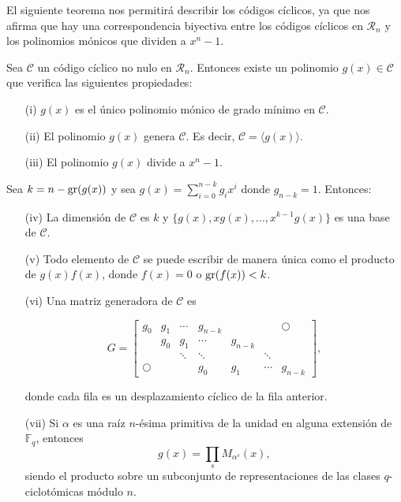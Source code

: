 El siguiente teorema nos permitirá describir los códigos cíclicos, ya que nos afirma que hay una correspondencia biyectiva entre los códigos cíclicos en $\mathcal{R}_n$ y los polinomios mónicos que dividen a $x^n - 1$.

\begin{teorema}\label{th:ci}
Sea $\mathcal{C}$ un código cíclico no nulo en $\mathcal{R}_n$. Entonces existe un polinomio $g(x) \in \mathcal{C}$ que verifica las siguientes propiedades:
\begin{itemize}
    \item[(i)] $g(x)$ es el único polinomio mónico de grado mínimo en $\mathcal{C}$.
    \item[(ii)] El polinomio $g(x)$ genera $\mathcal{C}$. Es decir, $\mathcal{C} = \langle g(x) \rangle.$
    \item[(iii)] El polinomio $g(x)$ divide a $x^n-1$.
\end{itemize}
Sea $k = n- \operatorname{gr}(g(x))$ y sea $g(x) = \sum_{i=0}^{n-k}g_ix^i$ donde $g_{n-k} = 1$. Entonces:
\begin{itemize}
    
    \item[(iv)] La dimensión de $\mathcal{C}$ es $k$ y $\{g(x),xg(x),\dots,x^{k-1}g(x)\}$ es una base de $\mathcal{C}$.
    \item[(v)] Todo elemento de $\mathcal{C}$ se puede escribir de manera única como el producto de $g(x)f(x)$, donde $f(x) = 0$ o $\operatorname{gr}(f(x)) < k$.
    \item[(vi)] Una matriz generadora de $\mathcal{C}$ es
    
    $$ G =
    \left[\begin{array}{ccccccc}
    g_0 & g_1 & \cdots & g_{n-k} & & & \bigcirc \\
     & g_0 & g_1 & \cdots & g_{n-k} & & \\
     & & \ddots & \ddots & & \ddots & \\
    \bigcirc & & & g_0 &g_1 & \cdots &g_{n-k}
    \end{array}
    \right],
    $$

    donde cada fila es un desplazamiento cíclico de la fila anterior.


    \item[(vii)] Si $\alpha$ es una raíz $n$-ésima primitiva de la unidad en alguna extensión de $\mathbb{F}_q$, entonces  $$g(x) = \prod_{s}M_{\alpha^s}(x),$$
    siendo el producto sobre un subconjunto de representaciones de las clases $q$-ciclotómicas módulo $n$.
\end{itemize}
\end{teorema}

